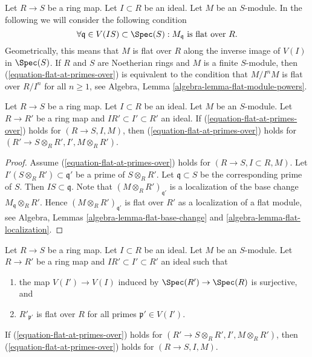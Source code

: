 \noindent
Let $R \to S$ be a ring map.
Let $I \subset R$ be an ideal.
Let $M$ be an $S$-module.
In the following we will consider the following condition
\begin{equation}
\label{equation-flat-at-primes-over}
\forall \mathfrak q \in V(IS) \subset \Spec(S) :
M_{\mathfrak q}\text{ is flat over }R.
\end{equation}
Geometrically, this means that $M$ is flat over $R$ along the inverse
image of $V(I)$ in $\Spec(S)$. If $R$ and $S$ are Noetherian rings and
$M$ is a finite $S$-module, then (\ref{equation-flat-at-primes-over})
is equivalent to the condition that $M/I^nM$ is flat over $R/I^n$
for all $n \geq 1$, see
Algebra, Lemma \ref{algebra-lemma-flat-module-powers}.

\begin{lemma}
\label{lemma-base-change-flat-at-primes-over}
Let $R \to S$ be a ring map.
Let $I \subset R$ be an ideal.
Let $M$ be an $S$-module.
Let $R \to R'$ be a ring map and $IR' \subset I' \subset R'$ an ideal.
If (\ref{equation-flat-at-primes-over}) holds for
$(R \to S, I, M)$, then (\ref{equation-flat-at-primes-over})
holds for $(R' \to S \otimes_R R', I', M \otimes_R R')$.
\end{lemma}

\begin{proof}
Assume (\ref{equation-flat-at-primes-over}) holds for
$(R \to S, I \subset R, M)$.
Let $I'(S \otimes_R R') \subset \mathfrak q'$ be a prime of $S \otimes_R R'$.
Let $\mathfrak q \subset S$ be the corresponding prime of $S$.
Then $IS \subset \mathfrak q$. Note that $(M \otimes_R R')_{\mathfrak q'}$
is a localization of the base change $M_{\mathfrak q} \otimes_R R'$.
Hence $(M \otimes_R R')_{\mathfrak q'}$ is flat over $R'$ as a localization
of a flat module, see
Algebra, Lemmas \ref{algebra-lemma-flat-base-change} and
\ref{algebra-lemma-flat-localization}.
\end{proof}

\begin{lemma}
\label{lemma-flat-descent-flat-at-primes-over}
Let $R \to S$ be a ring map.
Let $I \subset R$ be an ideal.
Let $M$ be an $S$-module.
Let $R \to R'$ be a ring map and $IR' \subset I' \subset R'$ an ideal
such that
\begin{enumerate}
\item the map $V(I') \to V(I)$ induced by
$\Spec(R') \to \Spec(R)$ is surjective, and
\item $R'_{\mathfrak p'}$ is flat over $R$ for all primes
$\mathfrak p' \in V(I')$.
\end{enumerate}
If (\ref{equation-flat-at-primes-over}) holds for
$(R' \to S \otimes_R R', I', M \otimes_R R')$, then
(\ref{equation-flat-at-primes-over}) holds for $(R \to S, I, M)$.
\end{lemma}

